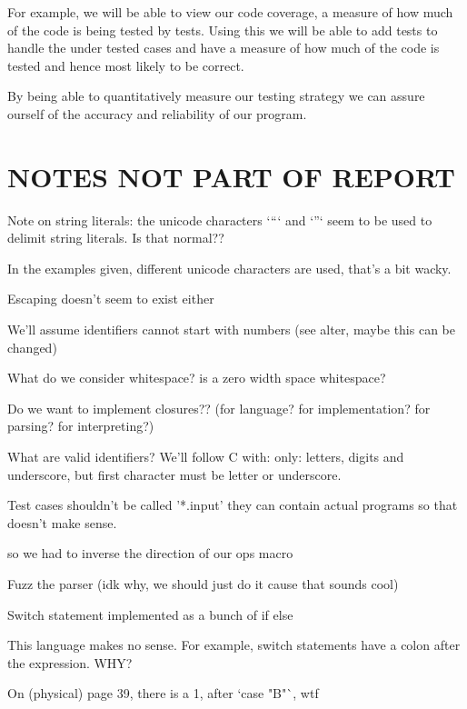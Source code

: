 \documentclass{article}
\begin{document}
For example, we will be able to view our code coverage, a measure of how much
of the code is being tested by tests. Using this we will be able to add tests
to handle the under tested cases and have a measure of how much of the code is
tested and hence most likely to be correct.

By being able to quantitatively measure our testing strategy we can assure
ourself of the accuracy and reliability of our program.

\section{NOTES NOT PART OF REPORT}

Note on string literals: the unicode characters `“` and `”` seem to be used to
delimit string literals. Is that normal??

In the examples given, different unicode characters are used, that's a bit
wacky.

Escaping doesn't seem to exist either

We'll assume identifiers cannot start with numbers (see alter, maybe this can
be changed)

What do we consider whitespace? is a zero width space whitespace?

Do we want to implement closures?? (for language? for implementation? for parsing? for interpreting?)

What are valid identifiers? We'll follow C with: only: letters, digits and
underscore, but first character must be letter or underscore.

Test cases shouldn't be called '*.input' they can contain actual programs so
that doesn't make sense.


so we had to inverse the direction of our ops macro


Fuzz the parser (idk why, we should just do it cause that sounds cool)

Switch statement implemented as a bunch of if else

This language makes no sense. For example, switch statements have a colon after
the expression. WHY?

On (physical) page 39, there is a 1, after `case "B"`, wtf
\end{document}
